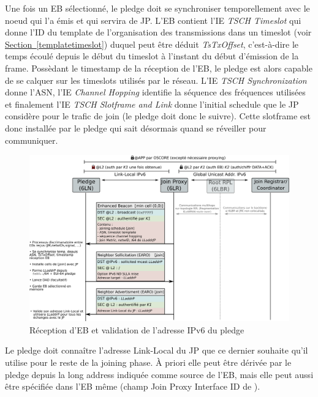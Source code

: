 \documentclass[]{report}
\newcommand{\wordlink}[2]{\hyperref[#2]{#1~\ref{#2}}}
\begin{document}
Une fois un EB sélectionné, le pledge doit se synchroniser temporellement avec le noeud qui l'a émis et qui servira de JP. L'EB contient l'IE \textit{TSCH Timeslot} qui donne l'ID du template de l'organisation des transmissions dans un timeslot (voir \wordlink{Section}{templatetimeslot}) duquel peut être déduit \textit{TsTxOffset}, c'est-à-dire le temps écoulé depuis le début du timeslot à l'instant du début d'émission de la frame. Possèdant le timestamp de la réception de l'EB, le pledge est alors capable de se calquer sur les timeslots utilisés par le réseau. L'IE \textit{TSCH Synchronization} donne l'ASN, l'IE \textit{Channel Hopping }identifie la séquence des fréquences utilisées et finalement l'IE \textit{TSCH Slotframe and Link }donne l'initial schedule que le JP considère pour le trafic de join (le pledge doit donc le suivre). Cette slotframe est donc installée par le pledge qui sait désormais quand se réveiller pour communiquer.\\

\newpage

\vspace{0.2cm}
	\begin{figure}[!h]
	\centering
	\includegraphics[width=\linewidth]{Joining_phase_part1}
	\caption{Réception d'EB et validation de l'adresse IPv6 du pledge}
	\label{fig:join_part1}
	\end{figure}
\vspace{0.2cm}

Le pledge doit connaître l'adresse Link-Local du JP que ce dernier souhaite qu'il utilise pour le reste de la joining phase. À priori elle peut être dérivée par le pledge depuis la long address indiquée comme source de l'EB, mais elle peut aussi être spécifiée dans l'EB même (champ Join Proxy Interface ID de \cite{ietf-6tisch-enrollment-enhanced-beacon-14}).\\
\end{document}
